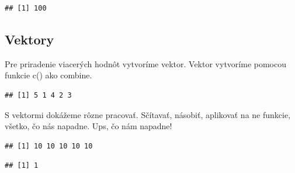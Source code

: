 \begin{verbatim}
## [1] 100
\end{verbatim}

\hypertarget{vektory}{%
\subsection{Vektory}\label{vektory}}

Pre priradenie viacerých hodnôt vytvoríme vektor. Vektor vytvoríme
pomocou funkcie c() ako combine.

\begin{Shaded}
\begin{Highlighting}[]

\StringTok{ }\NormalTok{(}\NormalTok{, }\NormalTok{, }\NormalTok{, }\NormalTok{, }\NormalTok{)}

\end{Highlighting}
\end{Shaded}

\begin{verbatim}
## [1] 5 1 4 2 3
\end{verbatim}

S vektormi dokážeme rôzne pracovať. Sčítavať, násobiť, aplikovať na ne
funkcie, všetko, čo nás napadne. Ups, čo nám napadne!

\begin{Shaded}
\begin{Highlighting}[]
\StringTok{ }\NormalTok{(}\NormalTok{, }\NormalTok{, }\NormalTok{, }\NormalTok{, }\NormalTok{)}
\OperatorTok{+}\StringTok{ }
\end{Highlighting}
\end{Shaded}

\begin{verbatim}
## [1] 10 10 10 10 10
\end{verbatim}

\begin{Shaded}
\begin{Highlighting}[]
\end{Highlighting}
\end{Shaded}

\begin{verbatim}
## [1] 1
\end{verbatim}

